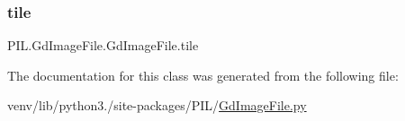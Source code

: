 \mbox{\label{classPIL_1_1GdImageFile_1_1GdImageFile_a6caf3ac328755cc72105622e773b20a7}} 
\subsubsection{\texorpdfstring{tile}{tile}}
{\footnotesize\ttfamily P\+I\+L.\+Gd\+Image\+File.\+Gd\+Image\+File.\+tile}



The documentation for this class was generated from the following file\+:\begin{DoxyCompactItemize}
\item 
venv/lib/python3./site-\/packages/\+P\+I\+L/\hyperlink{GdImageFile_8py}{Gd\+Image\+File.\+py}\end{DoxyCompactItemize}
